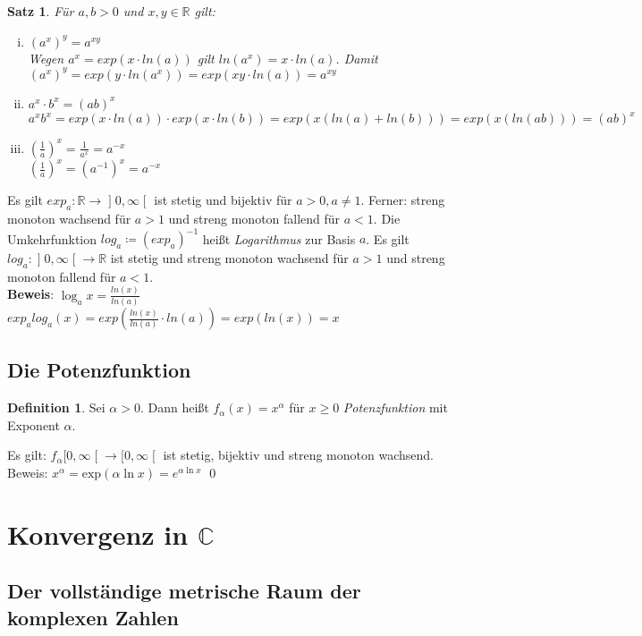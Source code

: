 \documentclass[ngerman,titlepage,twoside, parskip=half*]{scrreprt}
\newcommand*{\R}{\mathbb{R}}
\newcommand*{\C}{\mathbb{C}}
\theoremstyle{plain}
\newtheorem{theorem}{Satz}[section]
\theoremstyle{definition}
\newtheorem{definition}{Definition}
\theoremstyle{remark}
\newcommand*{\rsofint}[1]{[#1\mathclose{[}}  %
\newcommand*{\bsofint}[1]{\mathopen{]}#1\mathclose{[}} %
\begin{document}
\begin{theorem}
Für $a,b>0$ und $x,y\in \R$ gilt:
\begin{enumerate}[i)]
  \item $(a^x)^y=a^{xy}$\\
    Wegen $a^x=exp(x \cdot ln(a))$ gilt $ln (a^x)=x \cdot ln (a)$. Damit $(a^x)^y=exp(y\cdot ln(a^x))=exp(xy\cdot ln(a))
    =a^{xy}$
  \item $a^x\cdot b^x=(ab)^x$\\
    $a^xb^x=exp(x\cdot ln(a))\cdot exp(x\cdot ln(b))=exp(x(ln(a)+ln(b)))=exp(x(ln(ab)))=(ab)^x$
  \item $(\frac{1}{a})^x=\frac{1}{a^x}=a^{-x}$\\
    $(\frac{1}{a})^x=(a^{-1})^x=a^{-x}$
\end{enumerate}
\end{theorem}

Es gilt $exp_a \colon\R\rightarrow \bsofint{0,\infty}$ ist stetig und bijektiv für $a>0, a\neq 1$. Ferner: streng monoton wachsend
für $a>1$ und streng monoton fallend für $a<1$.
Die Umkehrfunktion $log_a\coloneqq(exp_a)^{-1}$ heißt \emph{Logarithmus} zur Basis $a$. Es gilt $log_a\colon
\bsofint{0,\infty} \rightarrow \R$ ist stetig und streng monoton wachsend für $a>1$ und streng monoton fallend für $a<1$.\\
\textbf{Beweis}: $\log_ax=\frac{ln(x)}{ln(a)}$\\
$exp_alog_a(x)=exp(\frac{ln(x)}{ln(a)}\cdot ln (a))=exp (ln (x))=x$

\subsection{Die Potenzfunktion}
\begin{definition}
Sei $\alpha>0$. Dann heißt $f_{\alpha}(x)=x^{\alpha}$ für $x\geq 0$ \emph{Potenzfunktion}
mit Exponent $\alpha$.
\end{definition}

Es gilt: $f_{\alpha}\rsofint{0,\infty}\rightarrow \rsofint{0,\infty}$ ist stetig, bijektiv und streng monoton
wachsend.\\
Beweis: $x^{\alpha}=\text{exp}(\alpha \ln x)=e^{\alpha \ln x}$
\qed

\section{Konvergenz in \texorpdfstring{$\C$}{C}}
\subsection{Der vollständige metrische Raum der komplexen Zahlen}
\end{document}
